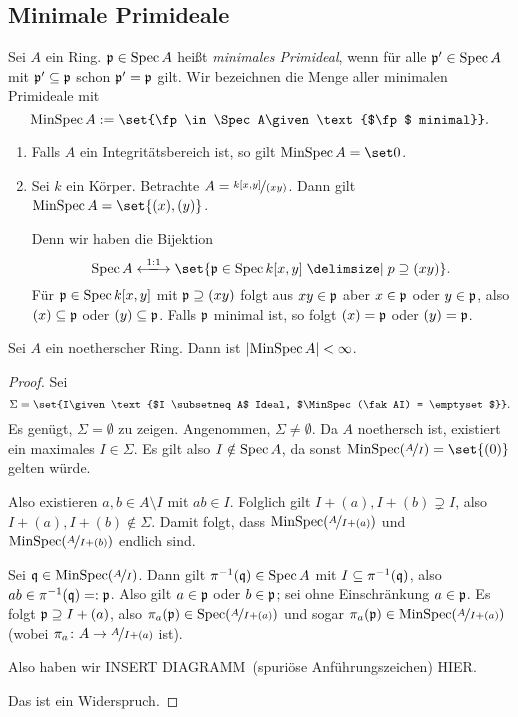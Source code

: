 \documentclass[12pt,a4paper]{scrartcl}
\theoremstyle{cplain}
\theoremstyle{cdef}
\begin{document}
\subsection{Minimale Primideale}
\begin{defi} Sei $A$ ein Ring. $\mathfrak{p}\in \operatorname{Spec} A$ heißt \emph{minimales Primideal}, wenn für alle $\mathfrak{p}'\in \operatorname{Spec} A$ mit $\mathfrak{p}'\subseteq \mathfrak{p}$ schon $\mathfrak{p}' = \mathfrak{p}$ gilt. Wir bezeichnen die Menge aller minimalen Primideale mit \[\MinSpec A := \set{\fp\in\Spec A\given \text{$\fp$ minimal}}.\]
\end{defi}
\begin{bsp}
	\leavevmode
	\begin{enumerate}
		\item Falls $A$ ein Integritätsbereich ist, so gilt $ \MinSpec A = \set 0$.
		\item Sei $k$ ein Körper. Betrachte $A = \nicefrac{k[x,y]}{(xy)}$. Dann gilt $\MinSpec A = \set{(x), (y)}$.
		
		Denn wir haben die Bijektion \[\Spec A \xlongleftrightarrow{1:1}\set {\fp\in\Spec k[x,y]\given p\supseteq (xy)}.\]
		Für $\mathfrak{p}\in \operatorname{Spec} k[x,y]$ mit $\mathfrak{p}\supseteq (xy)$ folgt aus  $xy\in \mathfrak{p}$ aber $ x\in \mathfrak{p}$ oder $y \in\mathfrak{p}$, also $(x)\subseteq \mathfrak{p}$ oder $(y)\subseteq \mathfrak{p}$. Falls $\mathfrak{p}$ minimal ist, so folgt $(x) = \mathfrak{p}$ oder $(y) = \mathfrak{p}$.
	\end{enumerate}
\end{bsp}
\begin{satz}
	Sei $A$ ein noetherscher Ring. Dann ist $\lvert\operatorname{MinSpec} A\rvert<\infty$.
\end{satz}
\begin{proof}
	Sei \[\Sigma = \set{I\given \text{$I \subsetneq A$ Ideal, $\MinSpec(\fak AI) = \emptyset$}}.\] Es genügt, $\Sigma = \emptyset$ zu zeigen. Angenommen, $\Sigma \neq \emptyset$. Da $A$ noethersch ist, existiert ein maximales $I\in \Sigma$. Es gilt also $I\notin \operatorname{Spec} A$, da sonst $\MinSpec(\fak{A}I) = \set {(0)}$ gelten würde. 
	
	Also existieren $a,b\in A\setminus I$ mit $ab\in I$. Folglich gilt $I+(a), I+(b)\supsetneq I$, also $I+(a), I+(b)\notin \Sigma$. Damit folgt, dass $\operatorname{MinSpec}(\nicefrac{A}{I+(a)})$ und $ \operatorname{MinSpec}(\nicefrac{A}{I+(b)})$ endlich sind.
	
	Sei $\mathfrak{q}\in\operatorname{MinSpec}(\nicefrac{A}{I})$. Dann gilt $\pi^{-1}(\mathfrak{q})\in \operatorname{Spec} A$ mit $I\subseteq \pi^{-1}(\mathfrak{q})$, also $ab\in \pi^{-1}(\mathfrak{q}) =: \mathfrak{p}$. Also gilt $a\in \mathfrak{p}$ oder $b\in \mathfrak{p}$; sei ohne Einschränkung $a\in \mathfrak{p}$. Es folgt $\mathfrak{p}\supseteq I+(a)$, also $\pi_a(\mathfrak{p}) \in\operatorname{Spec}(\nicefrac{A}{I+(a)})$ und sogar $\pi_{a}(\mathfrak{p}) \in \operatorname{MinSpec}(\nicefrac{A}{I+(a)})$ (wobei $\pi_a\colon A\to \nicefrac{A}{I+(a)}$ ist).
	
	Also haben wir
	INSERT \glqq DIAGRAMM\grqq\ (spuriöse Anführungszeichen) HIER. %
	
	Das ist ein Widerspruch.
\end{proof}
\end{document}
